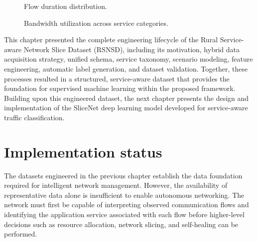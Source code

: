 \documentclass[12pt,a4paper]{report}
\begin{document}
	
	\begin{figure}[H]
		\centering
		\fbox{\rule{0pt}{3.2in}\rule{0.9\textwidth}{0pt}}
		\caption{Flow duration distribution.}
		\label{fig:flow_distribution}
	\end{figure}
	
	
	\begin{figure}[H]
		\centering
		\fbox{\rule{0pt}{3.2in}\rule{0.9\textwidth}{0pt}}
		\caption{Bandwidth utilization across service categories.}
		\label{fig:bandwidth}
	\end{figure}
	
	This chapter presented the complete engineering lifecycle of the Rural Service-aware Network Slice Dataset (RSNSD), including its motivation, hybrid data acquisition strategy, unified schema, service taxonomy, scenario modeling, feature engineering, automatic label generation, and dataset validation. Together, these processes resulted in a structured, service-aware dataset that provides the foundation for supervised machine learning within the proposed framework. Building upon this engineered dataset, the next chapter presents the design and implementation of the SliceNet deep learning model developed for service-aware traffic classification.
	
	
	\chapter{Implementation status}
	\label{chap:slicenet}
	
	The datasets engineered in the previous chapter establish the data foundation required for intelligent network management. However, the availability of representative data alone is insufficient to enable autonomous networking. The network must first be capable of interpreting observed communication flows and identifying the application service associated with each flow before higher-level decisions such as resource allocation, network slicing, and self-healing can be performed.
	
\end{document}
